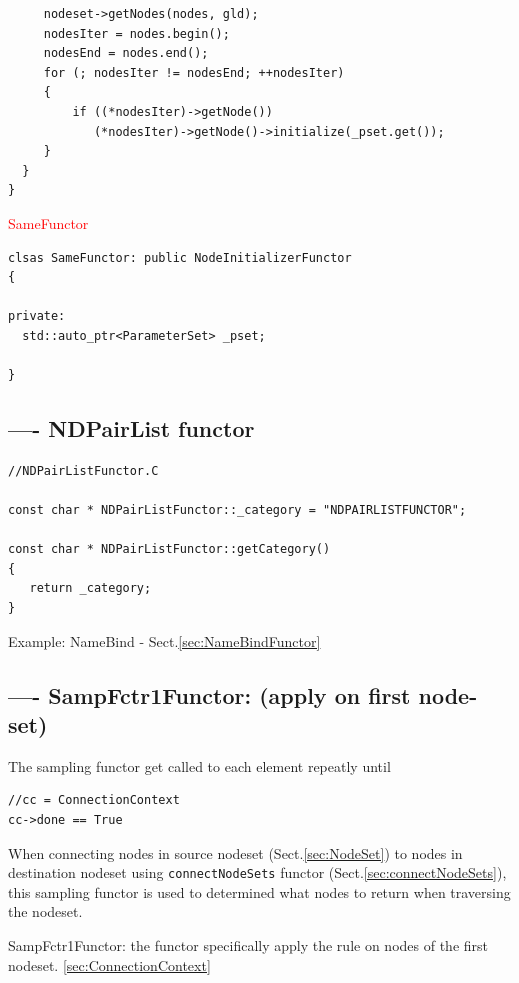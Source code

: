 \begin{enumerate}
\begin{verbatim}
     nodeset->getNodes(nodes, gld);
     nodesIter = nodes.begin();
     nodesEnd = nodes.end();
     for (; nodesIter != nodesEnd; ++nodesIter)
     {
         if ((*nodesIter)->getNode())
            (*nodesIter)->getNode()->initialize(_pset.get());
     }
  }
}
\end{verbatim}

\textcolor{red}{SameFunctor}
\begin{lstlisting}
clsas SameFunctor: public NodeInitializerFunctor
{

private:
  std::auto_ptr<ParameterSet> _pset;

}
\end{lstlisting}
  
  
\end{enumerate}



\subsection{---- NDPairList functor}
\label{sec:NDPairListFunctor}


\begin{verbatim}
//NDPairListFunctor.C

const char * NDPairListFunctor::_category = "NDPAIRLISTFUNCTOR";

const char * NDPairListFunctor::getCategory()
{
   return _category;
}
\end{verbatim}

Example: NameBind - Sect.\ref{sec:NameBindFunctor}

\subsection{---- SampFctr1Functor: (apply on first node-set)}
\label{sec:SampFctr1Functor}

The sampling functor get called to each element repeatly until 
\begin{verbatim}
//cc = ConnectionContext
cc->done == True
\end{verbatim}

When connecting nodes in source nodeset (Sect.\ref{sec:NodeSet}) to nodes in
destination nodeset using \verb!connectNodeSets! functor
(Sect.\ref{sec:connectNodeSets}), this sampling functor is used to determined
what nodes to return when traversing the nodeset.

SampFctr1Functor: the functor specifically apply the rule on nodes of the first
nodeset.
\ref{sec:ConnectionContext}

